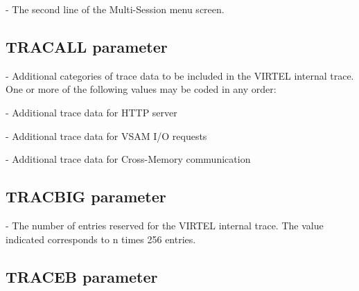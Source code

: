 \documentclass[letterpaper,10pt,english]{sphinxmanual}
\begin{document}
 - The second line of the Multi-Session menu screen.


\subsection{TRACALL parameter}
\label{\detokenize{Installation_Guide:index-126}}\label{\detokenize{Installation_Guide:tracall-parameter}}
\begin{sphinxVerbatim}[commandchars=\\\{\}]
 
\end{sphinxVerbatim}

 - Additional categories of trace data to be included in the VIRTEL internal trace. One or more of the following values may be coded in any order:

 - Additional trace data for HTTP server

 - Additional trace data for VSAM I/O requests

 - Additional trace data for Cross-Memory communication


\subsection{TRACBIG parameter}
\label{\detokenize{Installation_Guide:index-127}}\label{\detokenize{Installation_Guide:tracbig-parameter}}
\begin{sphinxVerbatim}[commandchars=\\\{\}]
 
\end{sphinxVerbatim}

 - The number of entries reserved for the VIRTEL internal trace. The value indicated corresponds to n times 256 entries.


\subsection{TRACEB parameter}
\label{\detokenize{Installation_Guide:traceb-parameter}}\label{\detokenize{Installation_Guide:index-128}}
\begin{sphinxVerbatim}[commandchars=\\\{\}]
 
\end{sphinxVerbatim}
\end{document}
